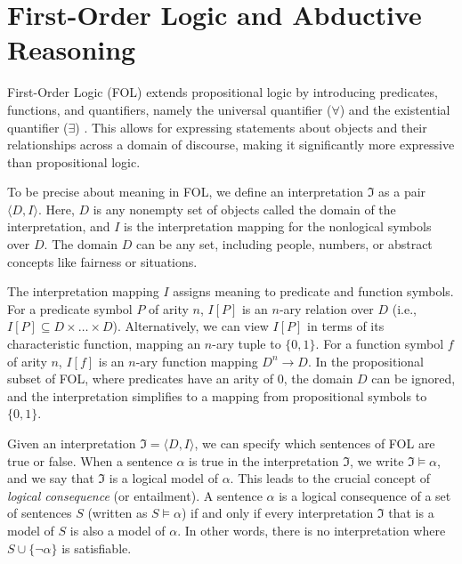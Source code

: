\section{First-Order Logic and Abductive Reasoning}
\label{sec:firstOrderLogic}
First-Order Logic (FOL) extends propositional logic by introducing predicates, functions, and quantifiers, namely the universal quantifier ($\forall$) and the existential quantifier ($\exists$) \citep{brachman2004knowledge}. This allows for expressing statements about objects and their relationships across a domain of discourse, making it significantly more expressive than propositional logic.

To be precise about meaning in FOL, we define an interpretation $\Im$ as a pair $\langle D, I \rangle$. Here, $D$ is any nonempty set of objects called the domain of the interpretation, and $I$ is the interpretation mapping for the nonlogical symbols over $D$. The domain $D$ can be any set, including people, numbers, or abstract concepts like fairness or situations. 

The interpretation mapping $I$ assigns meaning to predicate and function symbols. For a predicate symbol $P$ of arity $n$, $I[P]$ is an $n$-ary relation over $D$ (i.e., $I[P] \subseteq D \times \dots \times D$). Alternatively, we can view $I[P]$ in terms of its characteristic function, mapping an $n$-ary tuple to $\{0, 1\}$. For a function symbol $f$ of arity $n$, $I[f]$ is an $n$-ary function mapping $D^n \rightarrow D$. In the propositional subset of FOL, where predicates have an arity of 0, the domain $D$ can be ignored, and the interpretation simplifies to a mapping from propositional symbols to $\{0, 1\}$.

Given an interpretation $\Im = \langle D, I \rangle$, we can specify which sentences of FOL are true or false. When a sentence $\alpha$ is true in the interpretation $\Im$, we write $\Im \models \alpha$, and we say that $\Im$ is a logical model of $\alpha$. This leads to the crucial concept of \textit{logical consequence} (or entailment). A sentence $\alpha$ is a logical consequence of a set of sentences $S$ (written as $S \models \alpha$) if and only if every interpretation $\Im$ that is a model of $S$ is also a model of $\alpha$. In other words, there is no interpretation where $S \cup \{\neg \alpha\}$ is satisfiable.

